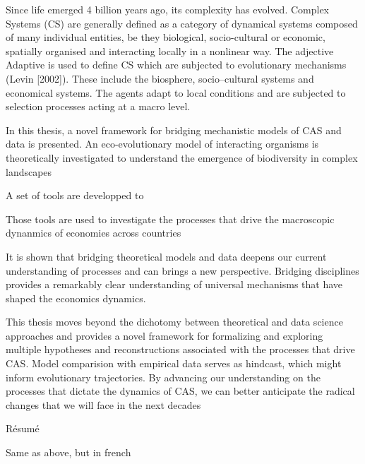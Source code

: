%
\label{sec:summary}

\begin{outline}
    \1 Since life emerged 4 billion years ago, its complexity has evolved.
        \2 Complex Systems (CS) are generally defined as a category of dynamical systems composed of many individual entities, be they biological, socio-cultural or economic, spatially organised and interacting locally in a nonlinear way. The adjective Adaptive is used to define CS which are subjected to evolutionary mechanisms (Levin [2002]). These include the biosphere, socio--cultural systems and economical systems. The agents adapt to local conditions and are subjected to selection processes acting at a macro level.
    
    \1 In this thesis, a novel framework for bridging mechanistic models of CAS and data is presented.
        \2 An eco-evolutionary model of interacting organisms is theoretically investigated 
            \3 to understand the emergence of biodiversity in complex landscapes

        \2 A set of tools are developped to 
        
        \2 Those tools are used to investigate the processes that drive the macroscopic dynanmics of economies across countries

    \1 It is shown that bridging theoretical models and data deepens our current understanding of processes and can brings a new perspective.
        \2 Bridging disciplines provides a remarkably clear understanding of universal mechanisms that have shaped the economics dynamics.

    \1 This thesis moves beyond the dichotomy between theoretical and data science approaches and provides a novel framework for formalizing and exploring multiple hypotheses and reconstructions associated with the processes that drive CAS. Model comparision with empirical data serves as hindcast, which might inform evolutionary trajectories. By advancing our understanding on the processes that dictate the dynamics of CAS, we can better anticipate the radical changes that we will face in the next decades
\end{outline}


{ Résumé}
\label{sec:summary-fr}

\begin{outline}
    \1 Same as above, but in french
\end{outline}